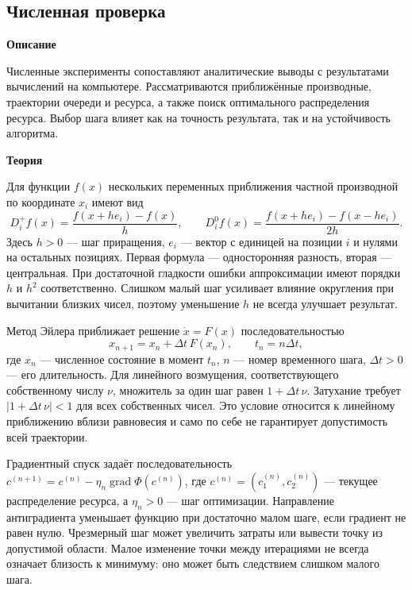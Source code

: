 \documentclass[12pt,a4paper]{article}
\newcommand{\taskhead}[1]{\par\textbf{#1}\par}
\begin{document}
\subsection{Численная проверка}
\taskhead{Описание}
Численные эксперименты сопоставляют аналитические выводы с результатами
вычислений на компьютере. Рассматриваются приближённые производные,
траектории очереди и ресурса, а также поиск оптимального распределения ресурса.
Выбор шага влияет как на точность результата, так и на устойчивость алгоритма.
\taskhead{Теория}
Для функции $f(x)$ нескольких переменных приближения частной производной
по координате $x_i$ имеют вид
\[
D_i^+f(x)=\frac{f(x+he_i)-f(x)}{h},\qquad
D_i^0f(x)=\frac{f(x+he_i)-f(x-he_i)}{2h}.
\]
Здесь $h>0$ --- шаг приращения, $e_i$ --- вектор с единицей на позиции $i$
и нулями на остальных позициях. Первая формула --- односторонняя разность,
вторая --- центральная. При достаточной гладкости ошибки аппроксимации
имеют порядки $h$ и $h^2$ соответственно. Слишком малый шаг усиливает
влияние округления при вычитании близких чисел, поэтому уменьшение $h$
не всегда улучшает результат.

Метод Эйлера приближает решение $\dot x=F(x)$ последовательностью
\[
x_{n+1}=x_n+\Delta t\,F(x_n),\qquad t_n=n\Delta t,
\]
где $x_n$ --- численное состояние в момент $t_n$, $n$ --- номер временного
шага, $\Delta t>0$ --- его длительность. Для линейного возмущения,
соответствующего собственному числу $\nu$, множитель за один шаг равен
$1+\Delta t\,\nu$. Затухание требует $|1+\Delta t\,\nu|<1$
для всех собственных чисел. Это условие относится к линейному приближению
вблизи равновесия и само по себе не гарантирует допустимость всей траектории.

Градиентный спуск задаёт последовательность
$c^{(n+1)}=c^{(n)}-\eta_n\operatorname{grad}\Phi(c^{(n)})$,
где $c^{(n)}=(c_1^{(n)},c_2^{(n)})$ --- текущее распределение ресурса,
а $\eta_n>0$ --- шаг оптимизации. Направление антиградиента уменьшает функцию
при достаточно малом шаге, если градиент не равен нулю.
Чрезмерный шаг может увеличить затраты или вывести точку из допустимой области.
Малое изменение точки между итерациями не всегда означает близость к минимуму:
оно может быть следствием слишком малого шага.
\end{document}
